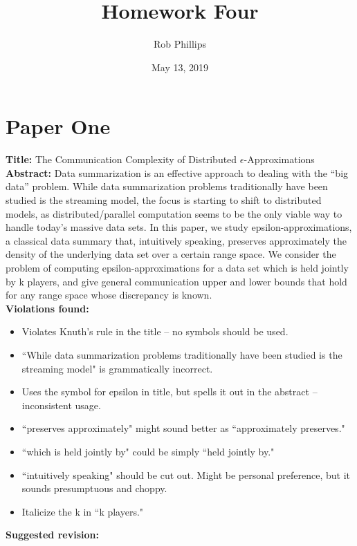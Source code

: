 \documentclass[11pt]{article}
\title{Homework Four}
\author{Rob Phillips}
\date{May 13, 2019}
\begin{document}
\maketitle

\section*{Paper One}

\textbf{Title:} The Communication Complexity of Distributed $\epsilon$-Approximations\\

\textbf{Abstract:} Data summarization is an effective approach to dealing with the ``big data'' problem.
While data summarization problems traditionally have been studied is the streaming
model, the focus is starting to shift to distributed models, as distributed/parallel
computation seems to be the only viable way to handle today's massive data sets. In
this paper, we study epsilon-approximations, a classical data summary that,
intuitively speaking, preserves approximately the density of the underlying data set
over a certain range space. We consider the problem of computing
epsilon-approximations for a data set which is held jointly by k players, and give
general communication upper and lower bounds that hold for any range space whose
discrepancy is known.\\

\textbf{Violations found:}

\begin{itemize}
    \item Violates Knuth's rule in the title -- no symbols should be used.
    \item ``While data summarization problems traditionally have been studied is the streaming model" is grammatically incorrect.
    \item Uses the symbol for epsilon in title, but spells it out in the abstract -- inconsistent usage.
    \item ``preserves approximately" might sound better as ``approximately preserves."
    \item ``which is held jointly by" could be simply ``held jointly by."
    \item ``intuitively speaking" should be cut out. Might be personal preference, but it sounds presumptuous and choppy.
    \item Italicize the k in ``k players."
\end{itemize}

\textbf{Suggested revision:}\\
\end{document}
